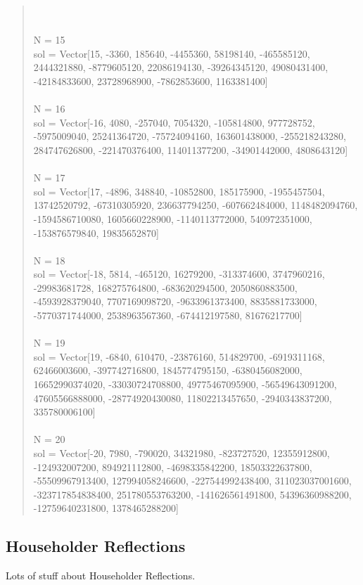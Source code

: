 \documentclass[letterpaper,12pt]{article}
\begin{document}
\begin{quote}
\\
\\N = 15
\\sol = Vector[15, -3360, 185640, -4455360, 58198140, -465585120, 2444321880, -8779605120, 22086194130, -39264345120, 49080431400, -42184833600, 23728968900, -7862853600, 1163381400]
\\
\\N = 16
\\sol = Vector[-16, 4080, -257040, 7054320, -105814800, 977728752, -5975009040, 25241364720, -75724094160, 163601438000, -255218243280, 284747626800, -221470376400, 114011377200, -34901442000, 4808643120]
\\
\\N = 17
\\sol = Vector[17, -4896, 348840, -10852800, 185175900, -1955457504, 13742520792, -67310305920, 236637794250, -607662484000, 1148482094760, -1594586710080, 1605660228900, -1140113772000, 540972351000, -153876579840, 19835652870]
\\
\\N = 18
\\sol = Vector[-18, 5814, -465120, 16279200, -313374600, 3747960216, -29983681728, 168275764800, -683620294500, 2050860883500, -4593928379040, 7707169098720, -9633961373400, 8835881733000, -5770371744000, 2538963567360, -674412197580, 81676217700]
\\
\\N = 19
\\sol = Vector[19, -6840, 610470, -23876160, 514829700, -6919311168, 62466003600, -397742716800, 1845774795150, -6380456082000, 16652990374020, -33030724708800, 49775467095900, -56549643091200, 47605566888000, -28774920430080, 11802213457650, -2940343837200, 335780006100]
\\
\\N = 20
\\sol = Vector[-20, 7980, -790020, 34321980, -823727520, 12355912800, -124932007200, 894921112800, -4698335842200, 18503322637800, -55509967913400, 127994058246600, -227544992438400, 311023037001600, -323717854838400, 251780553763200, -141626561491800, 54396360988200, -12759640231800, 1378465288200]
\end{quote}

\subsection{Householder Reflections}

Lots of stuff about Householder Reflections.
\end{document}
